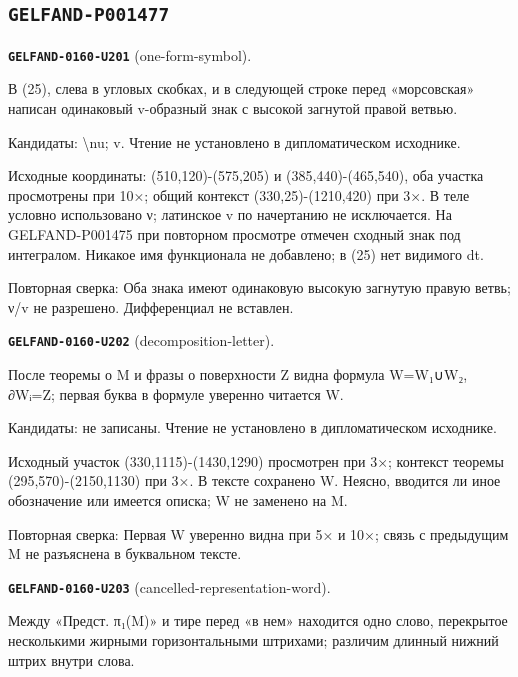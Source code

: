 \subsection*{\texttt{GELFAND-P001477}}
\par\noindent\leavevmode{}\label{GELFAND-0160-U201}\label{GELFAND-P001477:one-form-symbol}\textbf{\texttt{GELFAND-0160-U201}} (one-form-symbol).\nopagebreak[4]\par
В (25), слева в угловых скобках, и в следующей строке перед «морсовская» написан одинаковый v-образный знак с высокой загнутой правой ветвью.\par
Кандидаты: \textbackslash{}nu; v. Чтение не установлено в дипломатическом исходнике.\par
Исходные координаты: (510,120)-(575,205) и (385,440)-(465,540), оба участка просмотрены при 10×; общий контекст (330,25)-(1210,420) при 3×. В теле условно использовано ν; латинское v по начертанию не исключается. На GELFAND-P001475 при повторном просмотре отмечен сходный знак под интегралом. Никакое имя функционала не добавлено; в (25) нет видимого dt.\par
Повторная сверка: Оба знака имеют одинаковую высокую загнутую правую ветвь; ν/v не разрешено. Дифференциал не вставлен.\par\medskip
\par\noindent\leavevmode{}\label{GELFAND-0160-U202}\label{GELFAND-P001477:decomposition-letter}\textbf{\texttt{GELFAND-0160-U202}} (decomposition-letter).\nopagebreak[4]\par
После теоремы о M и фразы о поверхности Z видна формула W=W₁∪W₂, ∂Wᵢ=Z; первая буква в формуле уверенно читается W.\par
Кандидаты: не записаны. Чтение не установлено в дипломатическом исходнике.\par
Исходный участок (330,1115)-(1430,1290) просмотрен при 3×; контекст теоремы (295,570)-(2150,1130) при 3×. В тексте сохранено W. Неясно, вводится ли иное обозначение или имеется описка; W не заменено на M.\par
Повторная сверка: Первая W уверенно видна при 5× и 10×; связь с предыдущим M не разъяснена в буквальном тексте.\par\medskip
\par\noindent\leavevmode{}\label{GELFAND-0160-U203}\label{GELFAND-P001477:cancelled-representation-word}\textbf{\texttt{GELFAND-0160-U203}} (cancelled-representation-word).\nopagebreak[4]\par
Между «Предст. π₁(M)» и тире перед «в нем» находится одно слово, перекрытое несколькими жирными горизонтальными штрихами; различим длинный нижний штрих внутри слова.\par
